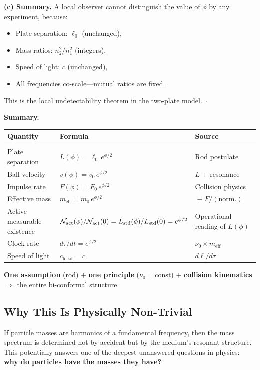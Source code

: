 \documentclass[11pt]{article}
\begin{document}
\textbf{(c) Summary.} A local observer cannot distinguish the value
of $\phi$ by any experiment, because:
\begin{itemize}
  \item Plate separation: $\ell_0$ (unchanged),
  \item Mass ratios: $n_2^2/n_1^2$ (integers),
  \item Speed of light: $c$ (unchanged),
  \item All frequencies co-scale---mutual ratios are fixed.
\end{itemize}
This is the local undetectability theorem in the two-plate model.
$\square$

\bigskip
\textbf{Summary.}
\begin{center}
\renewcommand{\arraystretch}{1.4}
\begin{tabular}{@{}lll@{}}
\textbf{Quantity} & \textbf{Formula} & \textbf{Source}
  \\[2pt]\hline\\[-6pt]
Plate separation
  & $L(\phi) = \ell_0\,e^{\phi/2}$
  & Rod postulate \\
Ball velocity
  & $v(\phi) = v_0\,e^{\phi/2}$
  & $L$ + resonance \\
Impulse rate
  & $F(\phi) = F_0\,e^{\phi/2}$
  & Collision physics \\
Effective mass
  & $m_{\mathrm{eff}} = m_0\,e^{\phi/2}$
  & $\equiv F/(\text{norm.})$ \\
Active measurable existence
  & $\mathcal N_{\rm act}(\phi)/\mathcal N_{\rm act}(0)
     = L_{\rm std}(\phi)/L_{\rm std}(0)=e^{\phi/2}$
  & Operational reading of $L(\phi)$ \\
Clock rate
  & $d\tau/dt = e^{\phi/2}$
  & $\nu_0 \times m_{\mathrm{eff}}$ \\
Speed of light
  & $c_{\mathrm{local}} = c$
  & $d\ell/d\tau$ \\
\end{tabular}
\end{center}

\textbf{One assumption} (rod) $+$ \textbf{one principle}
($\nu_0 = \mathrm{const}$) $+$ \textbf{collision kinematics}
$\Rightarrow$ the entire bi-conformal structure.

\subsection{Why This Is Physically Non-Trivial}

If particle masses are harmonics of a fundamental frequency, then
the mass spectrum is determined not by accident but by the medium's
resonant structure. This potentially answers one of the deepest
unanswered questions in physics: \textbf{why do particles have the
masses they have?}
\end{document}
